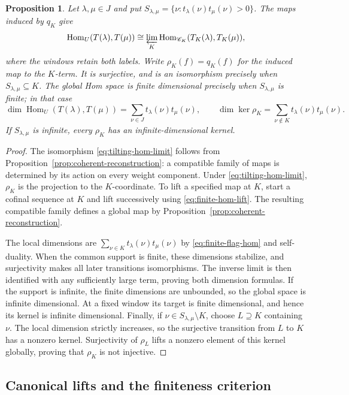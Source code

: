 \documentclass[11pt,reqno]{amsart}
\newcommand{\Hom}{\operatorname{Hom}}\newcommand{\End}{\operatorname{End}}\newcommand{\Ext}{\operatorname{Ext}}
\newtheorem{proposition}[theorem]{Proposition}
\theoremstyle{definition}
\theoremstyle{remark}
\numberwithin{equation}{section}
\begin{document}
\begin{proposition}\label{prop:tilting-hom}
Let $\lambda,\mu\in J$ and put
$S_{\lambda,\mu}=\{\nu:t_\lambda(\nu)t_\mu(\nu)>0\}$.
The maps induced by $q_K$ give
\begin{equation}\label{eq:tilting-hom-limit}
 \Hom_U(T(\lambda),T(\mu))
 \cong\varprojlim_K\Hom_{\CC_K}(T_K(\lambda),T_K(\mu)),
\end{equation}
where the windows retain both labels. Write $\rho_K(f)=q_K(f)$
for the induced map to the $K$-term. It is surjective,
and is an isomorphism precisely when $S_{\lambda,\mu}\subseteq K$.
The global Hom space is finite dimensional precisely when
$S_{\lambda,\mu}$ is finite; in that case
\[
 \dim\Hom_U(T(\lambda),T(\mu))
   =\sum_{\nu\in J}t_\lambda(\nu)t_\mu(\nu),\qquad
 \dim\ker\rho_K
   =\sum_{\nu\notin K}t_\lambda(\nu)t_\mu(\nu).
\]
If $S_{\lambda,\mu}$ is infinite, every $\rho_K$ has an
infinite-dimensional kernel.
\end{proposition}
\begin{proof}
The isomorphism \eqref{eq:tilting-hom-limit} follows from
Proposition~\ref{prop:coherent-reconstruction}: a compatible family
of maps is determined by its action on every weight component.
Under \eqref{eq:tilting-hom-limit}, $\rho_K$ is the projection to
the $K$-coordinate. To lift a specified map at $K$, start a cofinal
sequence at $K$ and lift successively using
\eqref{eq:finite-hom-lift}. The resulting compatible family defines
a global map by Proposition~\ref{prop:coherent-reconstruction}.

The local dimensions are
$\sum_{\nu\in K}t_\lambda(\nu)t_\mu(\nu)$ by
\eqref{eq:finite-flag-hom} and self-duality. When the common support
is finite, these dimensions stabilize, and surjectivity makes all
later transitions isomorphisms. The inverse limit is then identified
with any sufficiently large term, proving both dimension formulas.
If the support is infinite, the finite dimensions are unbounded, so the
global space is infinite dimensional. At a fixed window its target
is finite dimensional, and hence its kernel is infinite dimensional.
Finally, if $\nu\in S_{\lambda,\mu}\setminus K$, choose $L\supseteq K$
containing $\nu$. The local dimension strictly increases, so the
surjective transition from $L$ to $K$ has a nonzero kernel.
Surjectivity of $\rho_L$ lifts a nonzero element of this kernel
globally, proving that $\rho_K$ is not injective.
\end{proof}

\subsection{Canonical lifts and the finiteness criterion}
\end{document}
